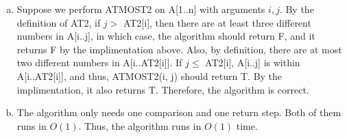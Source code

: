 \documentclass[10pt]{article}
\begin{document}
\begin{enumerate}[a.]
	\item %
		Suppose we perform ATMOST2 on A[1..n] with arguments $i, j$. 
		By the definition of AT2, if $j >$ AT2[i], then there are at least three
		different numbers in A[i..j], in which case, the algorithm should
		return F, and it returns F by the implimentation above.
		Also, by definition, there are at most two different numbers in A[i..AT2[i]].
		If $j \leq$ AT2[i], A[i..j] is within A[i..AT2[i]], and thus, ATMOST2(i, j)
		should return T. By the implimentation, it also returns T.
		Therefore, the algorithm is correct. 

	\item %
		The algorithm only needs one comparison and one return step.
		Both of them runs in $O(1)$. 
		Thus, the algorithm runs in $O(1)$ time.

\end{enumerate}		
		
\end{document}

